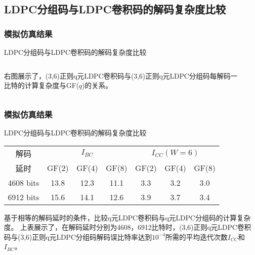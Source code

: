 \documentclass{beamer}
\begin{document}
\subsection{LDPC分组码与LDPC卷积码的解码复杂度比较}
\begin{frame}[shrink]
	\frametitle{模拟仿真结果}
		\begin{block}{LDPC分组码与LDPC卷积码的解码复杂度比较}
		\begin{columns}
		\begin{column}{0.4\textwidth}
		右图展示了，(3,6)正则q元LDPC卷积码与(3,6)正则q元LDPC分组码每解码一比特的计算复杂度与GF($q$)的关系。
		\end{column}
		\begin{column}{0.6\textwidth}
		\begin{center}
\end{center}
		\end{column}
		\end{columns}
		\end{block}
\end{frame}
\begin{frame}[shrink]
	\frametitle{模拟仿真结果}
		\begin{block}{LDPC分组码与LDPC卷积码的解码复杂度比较}
		\begin{center}
		\begin{tabular}{|c|c|c|c|c|c|c|}
 \hline
解码 & \multicolumn{3}{|c|}{$I_{BC}$} & \multicolumn{3}{|c|}{$I_{CC}(W=6)$} \\ \cline{2-7}
延时 & GF(2) & GF(4) & GF(8) & GF(2) & GF(4) & GF(8) \\ \hline
4608 bits & 13.8 & 12.3 & 11.1 & 3.3 & 3.2 & 3.0\\ \hline
6912 bits & 15.6 & 14.1 & 12.6 & 3.9 & 3.7 & 3.4\\ \hline
\end{tabular}
\end{center}
基于相等的解码延时的条件，比较q元LDPC卷积码与q元LDPC分组码的计算复杂度。
上表展示了，在解码延时分别为4608，6912比特时，(3,6)正则q元LDPC卷积码与(3,6)正则q元LDPC分组码解码误比特率达到$10^{-4}$所需的平均迭代次数$I_{CC}$和$I_{BC}$。
		\end{block}
\end{frame}
\end{document}
